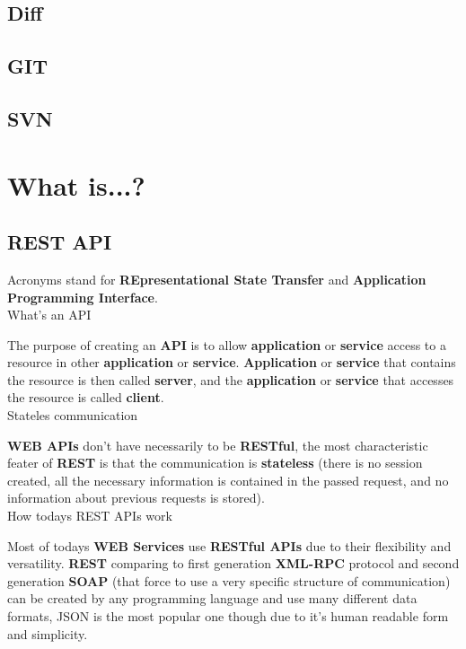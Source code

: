 \section{Diff}

\section{GIT}

\section{SVN}

\chapter{What is...?}

\section{REST API}


Acronyms stand for \textbf{REpresentational State Transfer} and \textbf{Application Programming Interface}.\\

What's an API

The purpose of creating an \textbf{API} is to allow \textbf{application} or \textbf{service} access to a resource in other \textbf{application} or \textbf{service}. \textbf{Application} or \textbf{service }that contains the resource is then called \textbf{server}, and the \textbf{application} or \textbf{service} that accesses the resource is called \textbf{client}.\\

Stateles communication

\textbf{WEB APIs} don't have necessarily to be \textbf{RESTful}, the most characteristic feater of \textbf{REST} is that the communication is \textbf{stateless} (there is no session created, all the necessary information is contained in the passed request, and no information about previous requests is stored).\\

How todays REST APIs work

Most of todays \textbf{WEB Services} use \textbf{RESTful APIs} due to their flexibility and versatility. \textbf{REST} comparing to first generation \textbf{XML-RPC} protocol and second generation \textbf{SOAP} (that force to use a very specific structure of communication)	can be created by any programming language and use many different data formats, JSON is the most popular one though due to it's human readable form and simplicity.\\

